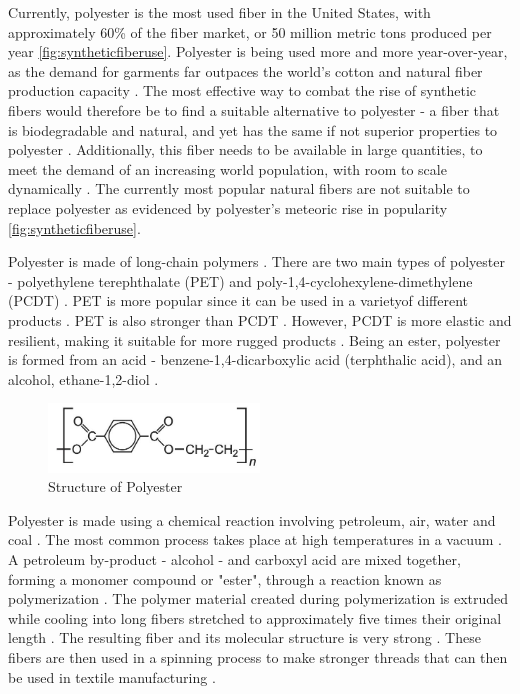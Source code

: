 \documentclass{article}
\begin{document}
Currently, polyester is the most used fiber in the United States, with approximately 60\% of the fiber market, or 50 million metric tons produced per year \ref{fig:syntheticfiberuse}\autocite{globaltradeanalysis}. Polyester is being used more and more year-over-year, as the demand for garments far outpaces the world's cotton and natural fiber production capacity \autocite{globaltradeanalysis}. The most effective way to combat the rise of synthetic fibers would therefore be to find a suitable alternative to polyester - a fiber that is biodegradable and natural, and yet has the same if not superior properties to polyester \autocite{naturalfiberprogressreport}. Additionally, this fiber needs to be available in large quantities, to meet the demand of an increasing world population, with room to scale dynamically \autocite{grandviewresearch}. The currently most popular natural fibers are not suitable to replace polyester as evidenced by polyester's meteoric rise in popularity \ref{fig:syntheticfiberuse}.

Polyester is made of long-chain polymers \autocite{polyesterstrength}. There are two main types of polyester - polyethylene terephthalate (PET) and poly-1,4-cyclohexylene-dimethylene (PCDT) \autocite{polyesterstrength}. PET is more popular since it can be used in a varietyof different products \autocite{polyesterstrength}. PET is also stronger than PCDT \autocite{craftechindustries}. However, PCDT is more elastic and resilient, making it suitable for more rugged products \autocite{polyesterstrength}. Being an ester, polyester is formed from an acid - benzene-1,4-dicarboxylic acid (terphthalic acid), and an alcohol, ethane-1,2-diol \autocite{polyesterstructure}.

\begin{figure}
  \centering
  \includegraphics[width=0.5\textwidth]{assets/polyester_structure.jpg}
  \caption{Structure of Polyester \protect\autocite{polyesterstructure}}
  \label{fig:polyesterstructure}
\end{figure}

Polyester is made using a chemical reaction involving petroleum, air, water and coal \autocite{craftechindustries}. The most common process takes place at high temperatures in a vacuum \autocite{craftechindustries}. A petroleum by-product - alcohol - and carboxyl acid are mixed together, forming a monomer compound or "ester", through a reaction known as polymerization \autocite{polyesterstrength}. The polymer material created during polymerization is extruded while cooling into long fibers stretched to approximately five times their original length \autocite{craftechindustries}. The resulting fiber and its molecular structure is very strong \autocite{polyesterstrength}. These fibers are then used in a spinning process to make stronger threads that can then be used in textile manufacturing \autocite{craftechindustries}.
\end{document}
